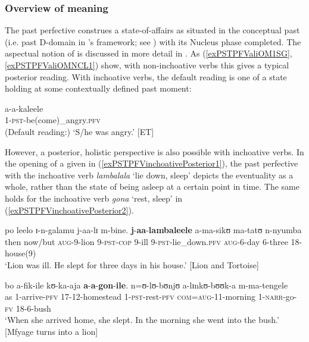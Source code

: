\subsubsection{Overview of meaning}\label{PastPerfectiveOverviewMeaning}
The past perfective construes a state-of-affairs as situated in the conceptual past (i.e. past D-domain in \citeauthor{BotneRKershnerT2008}'s framework; see ) with its Nucleus phase completed. The aspectual notion of  is discussed in more detail in . As (\ref{exPSTPFValiOM1SG}, \ref{exPSTPFValiOMNCL1}) show, with non-inchoative verbs this gives a typical posterior reading. With inchoative verbs, the default reading is one of a state holding at some contextually defined past moment:

\begin{exe}
\ex \gll a-a-kaleele\\
1-\textsc{pst}-be(come)\_angry.\textsc{pfv}\\
\glt (Default reading:) \lq S/he was angry.' [ET]
\end{exe}

However, a posterior, holistic perspective is also possible with inchoative verbs. In the opening of a  given in (\ref{exPSTPFVinchoativePosterior1}), the past perfective with the inchoative verb \textit{lambalala} \lq lie down, sleep' depicts the eventuality as a whole, rather than the state of being asleep at a certain point in time. The same holds for the inchoative verb \textit{gona} \lq rest, sleep' in (\ref{exPSTPFVinchoativePosterior2}).

\begin{exe}
\ex \label{exPSTPFVinchoativePosterior1}\gll po leelo ɪ-n-galamu j-aa-lɪ m-bine. \textbf{j}-\textbf{aa}-\textbf{lambaleele} a-ma-sikʊ ma-tatʊ n-nyumba\\
then now/but \textsc{aug}-9-lion 9-\textsc{pst}-\textsc{cop} 9-ill 9-\textsc{pst}-lie\_down.\textsc{pfv} \textsc{aug}-6-day 6-three 18-house(9)\\
\glt \lq Lion was ill. He slept for three days in his house.' [Lion and Tortoise]

\ex \label{exPSTPFVinchoativePosterior2}
\gll bo a-fik-ile kʊ-ka-aja \textbf{a}-\textbf{a}-\textbf{gon}-\textbf{ile}. n=ʊ-lʊ-bʊnjʊ a-lɪnkʊ-bʊʊk-a m-ma-tengele\\
as 1-arrive-\textsc{pfv} 17-12-homestead 1-\textsc{pst}-rest-\textsc{pfv} \textsc{com}=\textsc{aug}-11-morning 1-\textsc{narr}-go-\textsc{fv} 18-6-bush\\
\glt \lq When she arrived home, she slept. In the morning she went into the bush.' [Mfyage turns into a lion] %
\end{exe}

